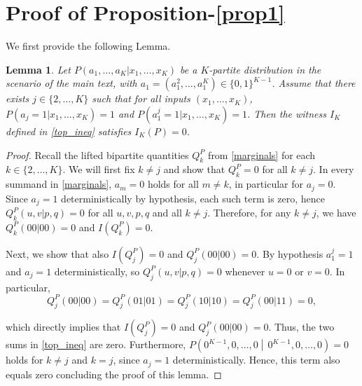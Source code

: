 \documentclass[pra,aps,reprint,superscriptaddress]{revtex4-2}
\theoremstyle{theorem}
\newtheorem{lem}{Lemma}[section]
\begin{document}
\section{Proof of Proposition-\ref{prop1}} \label{app:prop1}

We first provide the following Lemma. 


\begin{lem}\label{lem_B1} Let $P(a_1,\ldots,a_K|x_1,\ldots,x_K)$ be a $K$-partite distribution in the scenario of the main text, with $a_1=(a_1^2,\ldots,a_1^K)\in\{0,1\}^{K-1}$. Assume that there exists $j\in\{2,\ldots,K\}$ such that for all inputs $(x_1,\ldots,x_K)$, $P(a_j=1|x_1,\ldots,x_K)=1$ and $P(a_1^j=1|x_1,\ldots,x_K)=1$. Then the witness $I_K$ defined in \eqref{top_ineq} satisfies $I_K(P)=0$.
\end{lem}

\begin{proof}
  Recall the lifted bipartite quantities $Q_k^P$ from \eqref{marginals} for each $k\in\{2,\ldots,K\}$. We will first fix $k\neq j$ and show that $Q_k^P=0$ for all $k\neq j$. In every summand in \eqref{marginals}, $a_m=0$ holds for all $m\neq k$, in particular for $a_j=0$. Since $a_j=1$ deterministically by hypothesis, each such term is zero, hence $Q_k^P(u,v|p,q)=0$ for all $u,v,p,q$ and all $k\neq j$. Therefore, for any $k\neq j$, we have  $Q_k^P(00|00)=0$ and $I(Q_k^P)=0$.
  
  Next, we show that also $I(Q_j^P)=0$ and $Q_j^P(00|00)=0$. By hypothesis $a_1^j=1$ and $a_j=1$ deterministically, so $Q_j^P(u,v|p,q)=0$ whenever $u=0$ or $v=0$. In particular, 
\begin{equation}
Q_j^P(00|00)=Q_j^P(01|01)=Q_j^P(10|10)=Q_j^P(00|11)=0,
\end{equation}

which directly implies that $I(Q_j^P)=0$ and $Q_j^P(00|00)=0$. Thus, the two sums in \eqref{top_ineq} are zero. Furthermore, $P\left(0^{K-1},0,\ldots,0 \middle|\, 0^{K-1},0,\ldots,0\right)=0$ holds for $k\neq j$ and $k= j$, since $a_j =1$ deterministically. Hence, this term also equals zero concluding the proof of this lemma.   
\end{proof}
\end{document}
